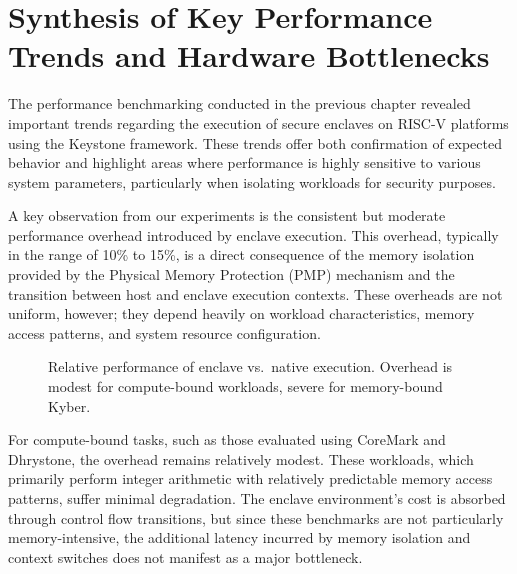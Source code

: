 \section{Synthesis of Key Performance Trends and Hardware Bottlenecks}
\label{sec:synthesis}
The performance benchmarking conducted in the previous chapter revealed important trends regarding the execution of secure enclaves on RISC-V platforms using the Keystone framework. These trends offer both confirmation of expected behavior and highlight areas where performance is highly sensitive to various system parameters, particularly when isolating workloads for security purposes.

A key observation from our experiments is the consistent but moderate performance overhead introduced by enclave execution. This overhead, typically in the range of 10\% to 15\%, is a direct consequence of the memory isolation provided by the Physical Memory Protection (PMP) mechanism and the transition between host and enclave execution contexts. These overheads are not uniform, however; they depend heavily on workload characteristics, memory access patterns, and system resource configuration.

\begin{figure}[htbp]
\centering
{}
\caption{Relative performance of enclave vs.\ native execution. Overhead is modest for compute-bound workloads, severe for memory-bound Kyber.}
\end{figure}

For compute-bound tasks, such as those evaluated using CoreMark and Dhrystone, the overhead remains relatively modest. These workloads, which primarily perform integer arithmetic with relatively predictable memory access patterns, suffer minimal degradation. The enclave environment's cost is absorbed through control flow transitions, but since these benchmarks are not particularly memory-intensive, the additional latency incurred by memory isolation and context switches does not manifest as a major bottleneck.

